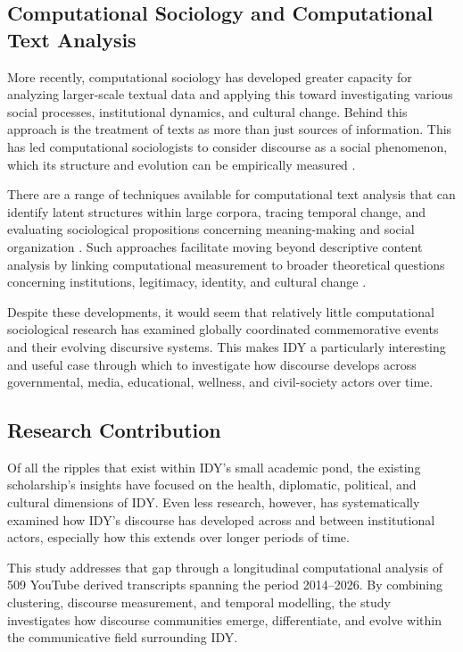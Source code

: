 \documentclass[11pt]{article}
\begin{document}
\subsection{Computational Sociology and Computational Text Analysis}

More recently, computational sociology has developed greater capacity for analyzing larger-scale textual data and applying this toward investigating various social processes, institutional dynamics, and cultural change. Behind this approach is the treatment of texts as more than just sources of information. This has led computational sociologists to consider discourse as a social phenomenon, which its structure and evolution can be empirically measured \cite{keuschnigg2018}.

There are a range of techniques available for computational text analysis that can identify latent structures within large corpora, tracing temporal change, and evaluating sociological propositions concerning meaning-making and social organization \cite{camilleri2021}. Such approaches facilitate moving beyond descriptive content analysis by linking computational measurement to broader theoretical questions concerning institutions, legitimacy, identity, and cultural change \cite{bonikowski2022,hurtadobodell2026}.

Despite these developments, it would seem that relatively little computational sociological research has examined globally coordinated commemorative events and their  evolving discursive systems. This makes IDY a particularly interesting and useful case through which to investigate how discourse develops across governmental, media, educational, wellness, and civil-society actors over time.


\subsection{Research Contribution}

Of all the ripples that exist within IDY's small academic pond, the existing scholarship's insights have focused on the health, diplomatic, political, and cultural dimensions of IDY. Even less research, however, has systematically examined how IDY's discourse has developed across and between institutional actors, especially how this extends over longer periods of time.

This study addresses that gap through a longitudinal computational analysis of 509 YouTube derived transcripts spanning the period 2014--2026. By combining clustering, discourse measurement, and temporal modelling, the study investigates how discourse communities emerge, differentiate, and evolve within the communicative field surrounding IDY.
\end{document}
